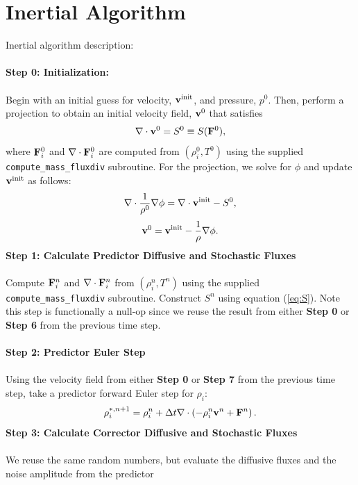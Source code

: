 \documentclass[final]{siamltex}
\def\Fb {{\bf F}}
\def\vb {{\bf v}}
\begin{document}
\clearpage

\section{Inertial Algorithm}
Inertial algorithm description:\\ \\
{\bf Step 0: Initialization:}\\ \\
Begin with an initial guess for velocity, $\vb^{\rm init}$, and pressure, $p^0$.
Then, perform a projection to obtain an initial velocity field, $\vb^0$ that satisfies
\begin{equation}
\nabla\cdot\vb^0 = S^0 \equiv S(\Fb^0),
\end{equation}
where $\Fb_i^0$ and $\nabla\cdot\Fb_i^0$ are computed from $(\rho_i^0,T^0)$ using the 
supplied {\tt compute\_mass\_fluxdiv} subroutine.
For the projection, we solve for $\phi$ and update $\vb^{\rm init}$ as follows:
\begin{equation}
\nabla\cdot\frac{1}{\rho^0}\nabla\phi = \nabla\cdot\vb^{\rm init} - S^0,
\end{equation}
\begin{equation}
\vb^0 = \vb^{\rm init} - \frac{1}{\rho}\nabla\phi.
\end{equation}
{\bf Step 1: Calculate Predictor Diffusive and Stochastic Fluxes}\\ \\
Compute $\Fb_i^n$ and $\nabla\cdot\Fb_i^n$ from $(\rho_i^n,T^n)$ using the supplied 
{\tt compute\_mass\_fluxdiv} subroutine.  Construct $S^n$ using equation (\ref{eq:S}).
Note this step is functionally a null-op since we reuse the result from 
either {\bf Step 0} or {\bf Step 6} from the previous time step.\\ \\
{\bf Step 2: Predictor Euler Step}\\ \\
Using the velocity field from either {\bf Step 0} or {\bf Step 7} from the previous
time step, take a predictor forward Euler step for $\rho_i$:
\begin{equation}
\rho_i^{*,n+1} = \rho_i^n + \Delta t\nabla\cdot\left(-\rho_i^n\vb^n + \Fb^n\right).
\end{equation}
{\bf Step 3: Calculate Corrector Diffusive and Stochastic Fluxes}\\ \\
We reuse the same random numbers, but evaluate the diffusive fluxes and the noise amplitude from the predictor
\end{document}
